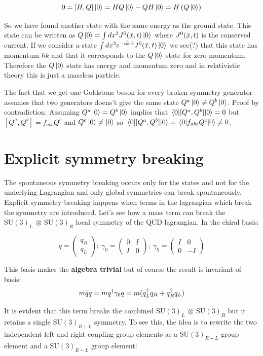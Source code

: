 \documentclass[a4,10pt,titlepage]{article}
\renewcommand\[{\begin{equation*}}
\renewcommand\]{\end{equation*}}
\newcommand{\be}{\begin{equation}}
\newcommand{\ee}{\end{equation}}
\numberwithin{equation}{section}
\newcommand{\ot}{\:\otimes\:}
\newcommand{\lp}{\left}
\newcommand{\rp}{\right}
\begin{document}
\be
0=[H,Q]\ket{0}=HQ\ket{0}-QH\ket{0}=H \lp( Q\ket{0} \rp)
\ee

So we have found another state with the same energy as the ground state. This state can be written as $Q\ket{0}=\int dx^3 J^{0}(\Bar{x},t) \ket{0}$ where $J^{0}(\Bar{x},t)$ is the conserved current. If we consider a state $\int dx^3 e^{-i\Bar{k}\cdot \Bar{x}}J^{0}(\Bar{x},t)\ket{0}$ we see(?) that this state has momentum $\hbar k$ and that it corresponds to the $Q\ket{0}$ state for zero momentum. Therefore the $Q\ket{0}$ state has energy and momentum zero and in relativistic theory this is just a massless particle.

The fact that we get one Goldstone boson for every broken symmetry generator assumes that two generators doens't give the same state $Q^a\ket{0}\neq Q^b\ket{0}$. Proof by contradiction: Assuming $Q^a\ket{0}= Q^b\ket{0}$ implies that $\mel{0}{[Q^a,Q^b]}{0}=0$ but $[Q^a,Q^b]=f_{abc}Q^c$ and $Q^c\ket{0}\neq \ket{0}$ so $\mel{0}{[Q^a,Q^b]}{0}=\mel{0}{f_{abc}Q^c}{0}\neq 0$.
\section{Explicit symmetry breaking}

The spontaneous symmetry breaking occurs only for the states and not for the underlying Lagrangian and only global symmetries can break spontaneously. Explicit symmetry breaking happens when terms in the lagrangian which break the symmetry are introduced. Let's see how a mass term can break the $\text{SU}(3)_L\ot\text{SU}(3)_R$ local symmetry of the QCD lagrangian. In the chiral basis:

\be 
q=
\begin{pmatrix}
    q_R\\
    q_L
\end{pmatrix} 
; \ 
\gamma_0=\begin{pmatrix}
    0&I\\
    I&0
\end{pmatrix}
; \ 
\gamma_5=\begin{pmatrix}
    I& 0\\
    0&-I
\end{pmatrix}
\ee

This basis makes the \textbf{algebra trivial} but of course the result is invariant of basis:
\be 
m\Bar{q}q = mq^\dag \gamma_0 q=m(q^{\dag}_{L}q_R+q^{\dag}_{R}q_{L})
\ee 

It is evident that this term breaks the combined $\text{SU}(3)_L\ot\text{SU}(3)_R$ but it retains a single $\text{SU}(3)_{R+L}$ symmetry. To see this, the idea is to rewrite the two independent left and right coupling group elements as a $\text{SU}(3)_{R+L}$ group element and a $\text{SU}(3)_{R-L}$ group element:
\end{document}
